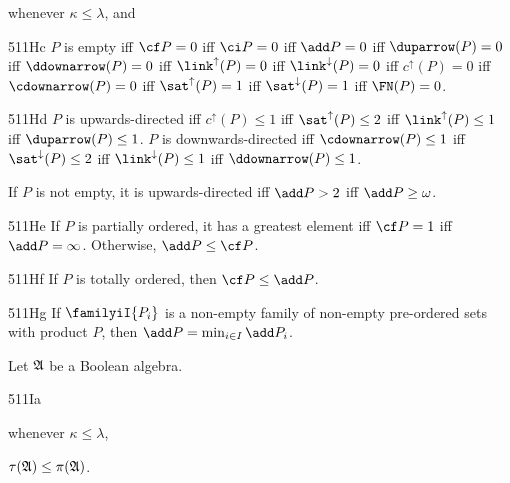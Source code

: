 
\noindent whenever $\kappa\le\lambda$, and


\spheader 511Hc $P$ is empty iff $\cf P=0$ iff
$\ci P=0$ iff $\add P=0$ iff $\duparrow(P)=0$ iff
$\ddownarrow(P)=0$ iff $\link^{\uparrow}(P)=0$ iff
$\link^{\downarrow}(P)=0$ iff $c^{\uparrow}(P)=0$ iff
$\cdownarrow(P)=0$ iff
$\sat^{\uparrow}(P)=1$ iff $\sat^{\downarrow}(P)=1$ iff $\FN(P)=0$.

\spheader 511Hd $P$ is upwards-directed iff
$c^{\uparrow}(P)\le 1$ iff $\sat^{\uparrow}(P)\le 2$ iff
$\link^{\uparrow}(P)\le 1$ iff $\duparrow(P)\le 1$.   
$P$ is downwards-directed iff $\cdownarrow(P)\le 1$ iff
$\sat^{\downarrow}(P)\le 2$ iff $\link^{\downarrow}(P)\le 1$ iff
$\ddownarrow(P)\le 1$.

If $P$ is not empty, it is upwards-directed iff $\add P>2$ iff
$\add P\ge\omega$.

\spheader 511He If $P$ is partially ordered, it has a greatest element
iff $\cf P=1$ iff
$\add P=\infty$.   Otherwise, $\add P\le\cf P$.

\spheader 511Hf If $P$ is totally ordered, then $\cf P\le\add P$.

\spheader 511Hg If $\familyiI{P_i}$ is a non-empty family of non-empty
pre-ordered sets with product $P$,
then $\add P=\min_{i\in I}\add P_i$.

 Let
$\frak A$ be a Boolean algebra.

\spheader 511Ia

\Centerline{$\link_{<\kappa}(\frak A)\le\link_{<\lambda}(\frak A)
\le\pi(\frak A)$}

\noindent whenever $\kappa\le\lambda$,


\noindent{}$\tau(\frak A)
\le\pi(\frak A)$.

